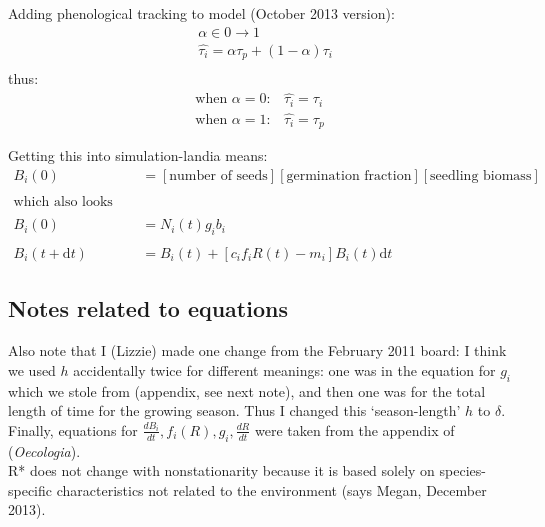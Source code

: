\documentclass[11pt,a4paper,oneside]{article}
\begin{document}
\noindent Adding phenological tracking to model (October 2013 version): \\
\begin{align*}
& \alpha \in 0 \rightarrow 1
\\
&\hat{\tau_{i}} = \alpha \tau_{p} + (1-\alpha)\tau_{i}\\
\end{align*}
\noindent thus:
\begin{align*}
\text{when } \alpha = 0: & \hat{\tau_{i}}=\tau_{i}
\\
\text{when }  \alpha = 1: & \hat{\tau_{i}}=\tau_{p}
\end{align*}

\noindent Getting this into simulation-landia means:
\begin{align*}
B_{i}(0) & = [\text{number of seeds}][\text{germination
  fraction}][\text{seedling biomass}]
\\
\\
\text{which also looks like:}
\\
\\
B_{i}(0) & = N_{i}(t) g_{i}b_{i}
\\
\\
B_{i}(t+\mathrm{d}t) & =B_{i}(t)+[c_{i}f_{i}R(t)-m_{i}]B_{i}(t)\mathrm{d}t
\end{align*}

\subsection{Notes related to equations}

\noindent Also note that I (Lizzie) made one change from the February 2011 board: I think we
used \(h\) accidentally twice for different meanings: one was in the
equation for \(g_{i}\) which we stole from \cite{Chesson:2004eo}
(appendix, see next note), and then one was for the total length of time for the
growing season. Thus I changed this `season-length' \(h\) to
\(\delta\).\\

\noindent Finally, equations for \(\frac{dB_{i}}{dt}, f_{i}(R), g_{i},
\frac{dR}{dt}\) were taken from the appendix of \cite{Chesson:2004eo} (\emph{Oecologia}).\\

\noindent R* does not change with nonstationarity because it is based solely on species-specific characteristics not related to the environment (says Megan, December 2013).
\end{document}
